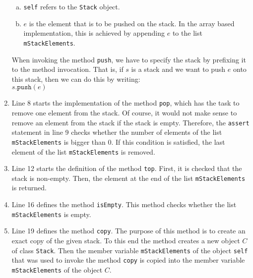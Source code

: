 \begin{enumerate}
\begin{enumerate}[(a)]
      \item \texttt{self} refers to the \texttt{Stack} object.
      \item $e$ is the element that is to be pushed on the stack.  In the array based
            implementation, this is achieved by appending $e$ to the list \texttt{mStackElements}.
      \end{enumerate} 
      When invoking the method \texttt{push}, we have to specify the stack by prefixing it to the method
      invocation.  That is, if $s$ is a stack and we want to push $e$ onto this stack, then we can do this by
      writing: 
      \\[0.2cm]
      \hspace*{1.3cm}
      $s\texttt{.push}(e)$
\item Line 8 starts the implementation of the method \texttt{pop}, which has the task to remove 
      one element from the stack.  Of course, it would not make sense to remove an element from the
      stack if the stack is empty.  Therefore, the \texttt{assert} statement in line 9 checks
      whether the number of elements of the list \texttt{mStackElements} is bigger than $0$.
      If this condition is satisfied, the last element of the list \texttt{mStackElements} is removed.
\item Line 12 starts the definition of the method \texttt{top}.  First, it is checked that the stack
      is non-empty.  Then, the element at the end of the list \texttt{mStackElements} is returned.
\item Line 16 defines the method \texttt{isEmpty}.  This method checks whether the list
      \texttt{mStackElements} is empty.
\item Line 19 defines the method \texttt{copy}.  The purpose of this method is to create an exact
      copy of the given stack.  To this end the method creates a new object $C$ of class \texttt{Stack}.
      Then the member variable \texttt{mStackElements} of the object \texttt{self} that was used to invoke
      the method \texttt{copy} is copied into the member variable \texttt{mStackElements} of the object $C$.


\end{enumerate}
